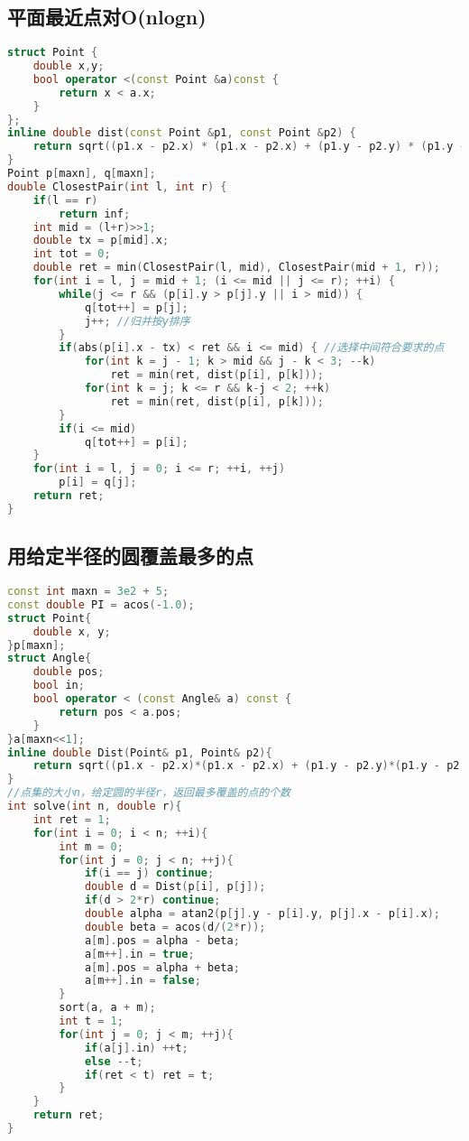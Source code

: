 \subsection{平面最近点对O(nlogn)}

\begin{lstlisting}[language=C++]
struct Point {
    double x,y;
    bool operator <(const Point &a)const {
        return x < a.x;
    }
};
inline double dist(const Point &p1, const Point &p2) {
    return sqrt((p1.x - p2.x) * (p1.x - p2.x) + (p1.y - p2.y) * (p1.y - p2.y));
}
Point p[maxn], q[maxn];
double ClosestPair(int l, int r) {
    if(l == r)
        return inf;
    int mid = (l+r)>>1;
    double tx = p[mid].x;
    int tot = 0;
    double ret = min(ClosestPair(l, mid), ClosestPair(mid + 1, r));
    for(int i = l, j = mid + 1; (i <= mid || j <= r); ++i) {
        while(j <= r && (p[i].y > p[j].y || i > mid)) {
            q[tot++] = p[j];
            j++; //归并按y排序
        }
        if(abs(p[i].x - tx) < ret && i <= mid) { //选择中间符合要求的点
            for(int k = j - 1; k > mid && j - k < 3; --k)
                ret = min(ret, dist(p[i], p[k]));
            for(int k = j; k <= r && k-j < 2; ++k)
                ret = min(ret, dist(p[i], p[k]));
        }
        if(i <= mid)
            q[tot++] = p[i];
    }
    for(int i = l, j = 0; i <= r; ++i, ++j)
        p[i] = q[j];
    return ret;
}
\end{lstlisting}

\subsection{用给定半径的圆覆盖最多的点}

\begin{lstlisting}[language=C++]
const int maxn = 3e2 + 5;
const double PI = acos(-1.0);
struct Point{
    double x, y;
}p[maxn];
struct Angle{
    double pos;
    bool in;
    bool operator < (const Angle& a) const {
        return pos < a.pos;
    }
}a[maxn<<1];
inline double Dist(Point& p1, Point& p2){
    return sqrt((p1.x - p2.x)*(p1.x - p2.x) + (p1.y - p2.y)*(p1.y - p2.y));
}
//点集的大小n，给定圆的半径r，返回最多覆盖的点的个数
int solve(int n, double r){
    int ret = 1;
    for(int i = 0; i < n; ++i){
        int m = 0;
        for(int j = 0; j < n; ++j){
            if(i == j) continue;
            double d = Dist(p[i], p[j]);
            if(d > 2*r) continue;
            double alpha = atan2(p[j].y - p[i].y, p[j].x - p[i].x);
            double beta = acos(d/(2*r));
            a[m].pos = alpha - beta;
            a[m++].in = true;
            a[m].pos = alpha + beta;
            a[m++].in = false;
        }
        sort(a, a + m);
        int t = 1;
        for(int j = 0; j < m; ++j){
            if(a[j].in) ++t;
            else --t;
            if(ret < t) ret = t;
        }
    }
    return ret;
}
\end{lstlisting}

